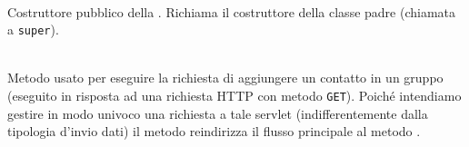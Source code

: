 \begin{description}
	\item{}\\
	Costruttore pubblico della . Richiama il costruttore della classe padre (chiamata a \texttt{super}).
	
	\item{}\\
	Metodo usato per eseguire la richiesta di aggiungere un contatto in un gruppo (eseguito in risposta ad una richiesta HTTP con metodo \texttt{GET}). Poiché intendiamo gestire in modo univoco una richiesta a tale servlet (indifferentemente dalla tipologia d'invio dati) il metodo reindirizza il flusso principale al metodo .
	

\end{description}
